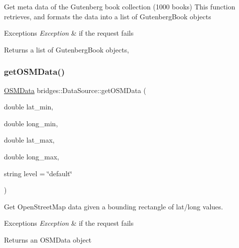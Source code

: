 Get meta data of the Gutenberg book collection (1000 books) This function retrieves, and formats the data into a list of Gutenberg\+Book objects


\begin{DoxyExceptions}{Exceptions}
{\em Exception} & if the request fails\\
\hline
\end{DoxyExceptions}
\begin{DoxyReturn}{Returns}
a list of Gutenberg\+Book objects, 
\end{DoxyReturn}
\mbox{\label{classbridges_1_1_data_source_a57736934a90bdb86948a7c338ec81a2d}} 
\subsubsection{\texorpdfstring{get\+O\+S\+M\+Data()}{getOSMData()}\hspace{0.1cm}{\footnotesize\ttfamily [1/2]}}
{\footnotesize\ttfamily \mbox{\hyperlink{classbridges_1_1dataset_1_1_o_s_m_data}{O\+S\+M\+Data}} bridges\+::\+Data\+Source\+::get\+O\+S\+M\+Data (\begin{DoxyParamCaption}\item[{double}]{lat\+\_\+min,  }\item[{double}]{long\+\_\+min,  }\item[{double}]{lat\+\_\+max,  }\item[{double}]{long\+\_\+max,  }\item[{string}]{level = {\ttfamily \char`\"{}default\char`\"{}} }\end{DoxyParamCaption})\hspace{0.3cm}{\ttfamily [inline]}}

Get Open\+Street\+Map data given a bounding rectangle of lat/long values.


\begin{DoxyExceptions}{Exceptions}
{\em Exception} & if the request fails\\
\hline
\end{DoxyExceptions}
\begin{DoxyReturn}{Returns}
an O\+S\+M\+Data object 
\end{DoxyReturn}
\mbox{\label{classbridges_1_1_data_source_a3151f5b2a27b5d6b11e1c5cb55d51655}} 
